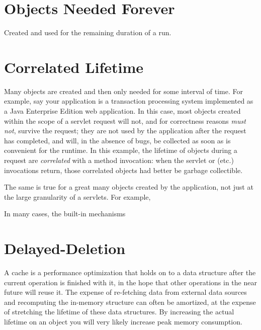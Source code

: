 \section{Objects Needed Forever}

Created and used for the remaining duration of a run.


\section{Correlated Lifetime}

Many objects are created and then only needed for some interval of time. For
example, say your application is a transaction processing system implemented as
a Java Enterprise Edition web application. In this case, most objects
created within the scope of a servlet request will not, and for correctness
reasons {\em must not}, survive the request; they are not used by the 
application after the request has completed, and will, in the absence of bugs,
be collected as soon as is convenient for the runtime. In this example, the
lifetime of objects during a request are {\em correlated} with a method
invocation: when the servlet  or  (etc.) invocations
return, those correlated objects had better be garbage collectible.

The same is true for a great many objects created by the application, not just
at the large granularity of a servlets. For example,

In many cases, the built-in mechanisms 

\section{Delayed-Deletion}

A cache is a performance optimization that holds on to a data structure after the
current operation is finished with it, in the hope that other operations in the
near future will reuse it. The expense of re-fetching data from external data
sources and recomputing the in-memory structure can often be amortized, at the
expense of stretching the lifetime of these data structures. By increasing the
actual lifetime on an object you will very likely increase peak memory
consumption.





